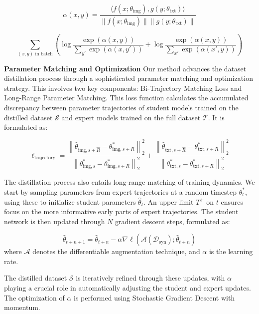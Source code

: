 \documentclass[sigconf, nonacm]{acmart}
\begin{document}
\begin{equation}
\alpha(x, y)=\frac{\langle f(x ; \theta_{\mathrm{img}}), g(y ; \theta_{\mathrm{txt}})\rangle}{\big\|f(x ; \theta_{\mathrm{img}})\big\|\big\|g(y ; \theta_{\mathrm{txt}})\big\|}
\end{equation}


\begin{equation}
\sum_{(x, y) \text{ in batch}}\left(\log \frac{\exp(\alpha(x, y))}{\sum_{y'} \exp(\alpha(x, y'))}+\log \frac{\exp(\alpha(x, y))}{\sum_{x'} \exp(\alpha(x', y))}\right)
\end{equation}


\textbf{Parameter Matching and Optimization} Our method advances the dataset distillation process through a sophisticated parameter matching and optimization strategy. This involves two key components: Bi-Trajectory Matching Loss and Long-Range Parameter Matching. This loss function calculates the accumulated discrepancy between parameter trajectories of student models trained on the distilled dataset ${\mathcal{S}}$ and expert models trained on the full dataset $\mathcal{T}$. It is formulated as:

\begin{equation}
\ell_{\text{trajectory}} = \frac{\left\|\hat{\theta}_{\text{img}, s+\hat{R}} - \theta_{\text{img}, s+R}^*\right\|_2^2}{\left\|\theta_{\text{img}, s}^* - \theta_{\text{img}, s+R}^*\right\|_2^2} + \frac{\left\|\hat{\theta}_{\text{txt}, s+\hat{R}} - \theta_{\text{txt}, s+R}^*\right\|_2^2}{\left\|\theta_{\text{txt}, s}^* - \theta_{\text{txt}, s+R}^*\right\|_2^2}
\end{equation}

The distillation process also entails long-range matching of training dynamics. We start by sampling parameters from expert trajectories at a random timestep $\theta_t^*$, using these to initialize student parameters $\hat{\theta}_t$. An upper limit $T^{+}$ on $t$ ensures focus on the more informative early parts of expert trajectories. The student network is then updated through $N$ gradient descent steps, formulated as:

\begin{equation}
\hat{\theta}_{t+n+1} = \hat{\theta}_{t+n} - \alpha \nabla \ell\left(\mathcal{A}\left(\mathcal{D}_{\text{syn}}\right); \hat{\theta}_{t+n}\right)
\end{equation}
where $\mathcal{A}$ denotes the differentiable augmentation technique, and $\alpha$ is the learning rate.

The distilled dataset ${\mathcal{S}}$ is iteratively refined through these updates, with $\alpha$ playing a crucial role in automatically adjusting the student and expert updates. The optimization of $\alpha$ is performed using Stochastic Gradient Descent with momentum.
\end{document}
